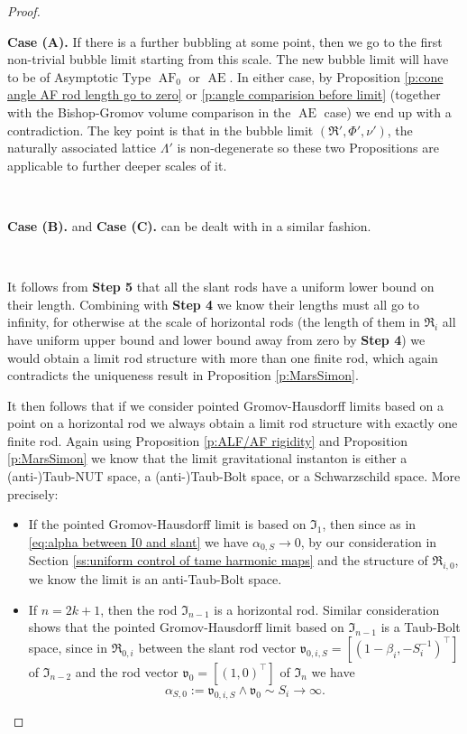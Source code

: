 \documentclass[a4paper,11pt]{amsart}
\theoremstyle{definition}
\numberwithin{equation}{section}
\newcommand{\mv} {\mathfrak v}
\newcommand{\mI} {\mathfrak I}
\newcommand{\mR} {\mathfrak R}
\DeclareMathOperator{\Ae}{AE}
\DeclareMathOperator{\AF}{AF}
\begin{document}
\begin{proof}
\

{\bf Case (A).} If there is a further bubbling at some point, then we go to the first non-trivial bubble limit starting from this scale. The new bubble limit will have to be of Asymptotic Type $\AF_0$ or $\Ae$. In either case, by Proposition \ref{p:cone angle AF rod length go to zero} or \ref{p:angle comparision before limit} (together with the Bishop-Gromov volume comparison in the $\Ae$ case) we end up with a contradiction. The key point is that in the bubble limit $(\mR',\Phi',\nu')$, the naturally associated lattice $\Lambda'$ is non-degenerate so these two Propositions are applicable to further deeper scales of it.



\

{\bf Case (B).} and {\bf Case (C).} can be dealt with in a similar fashion. 

\

 It follows from {\bf Step 5} that all the slant rods have a uniform lower bound on their length. Combining with {\bf Step 4} we know their lengths must all go to infinity, for otherwise at the scale of horizontal rods (the length of them in $\mR_i$ all have uniform upper bound and lower bound away from zero by {\bf Step 4}) we would obtain a limit rod structure with more than one finite rod, which again contradicts the uniqueness result in  Proposition \ref{p:MarsSimon}. 

It then follows that if we consider pointed Gromov-Hausdorff limits based on a point on a horizontal rod we always obtain a  limit rod structure with exactly one finite rod. Again using Proposition \ref{p:ALF/AF rigidity} and Proposition \ref{p:MarsSimon} we know  that the limit gravitational instanton is either a (anti-)Taub-NUT space, a (anti-)Taub-Bolt space, or a Schwarzschild space. More precisely:
\begin{itemize}
    \item If the pointed Gromov-Hausdorff limit is based on $\mI_1$, then since as in \eqref{eq:alpha between I0 and slant} we have $\alpha_{0,S}\to0$, by our consideration in Section \ref{ss:uniform control of tame harmonic maps} and the structure of $\mR_{i,0}$, we know the limit is an anti-Taub-Bolt space.


    
    \item If $n=2k+1$, then the rod $\mI_{n-1}$ is a horizontal rod. Similar consideration shows that the pointed Gromov-Hausdorff limit based on $\mI_{n-1}$ is a  Taub-Bolt space, since in $\mR_{0,i}$ between the slant rod vector $\mv_{0,i,S}=[(1-\beta_i,-S_i^{-1})^\top]$ of $\mI_{n-2}$ and the rod vector $\mv_0=[(1,0)^\top]$ of $\mI_n$ we have
    $$\alpha_{S,0}:=\mv_{0,i,S}\wedge \mv_{0}\sim S_i\to\infty.$$


\end{itemize}
\end{proof}
\end{document}
